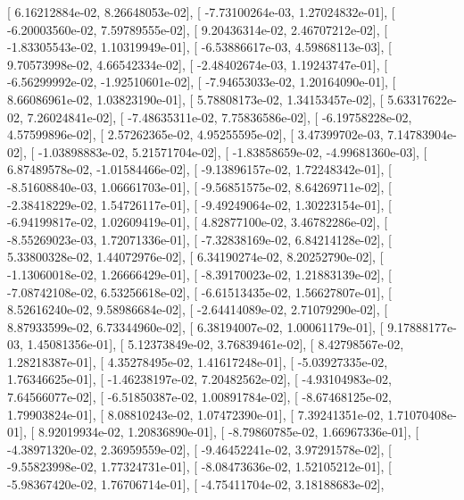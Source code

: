 \documentclass{article}
\begin{document}
       [  6.16212884e-02,   8.26648053e-02],
       [ -7.73100264e-03,   1.27024832e-01],
       [ -6.20003560e-02,   7.59789555e-02],
       [  9.20436314e-02,   2.46707212e-02],
       [ -1.83305543e-02,   1.10319949e-01],
       [ -6.53886617e-03,   4.59868113e-03],
       [  9.70573998e-02,   4.66542334e-02],
       [ -2.48402674e-03,   1.19243747e-01],
       [ -6.56299992e-02,  -1.92510601e-02],
       [ -7.94653033e-02,   1.20164090e-01],
       [  8.66086961e-02,   1.03823190e-01],
       [  5.78808173e-02,   1.34153457e-02],
       [  5.63317622e-02,   7.26024841e-02],
       [ -7.48635311e-02,   7.75836586e-02],
       [ -6.19758228e-02,   4.57599896e-02],
       [  2.57262365e-02,   4.95255595e-02],
       [  3.47399702e-03,   7.14783904e-02],
       [ -1.03898883e-02,   5.21571704e-02],
       [ -1.83858659e-02,  -4.99681360e-03],
       [  6.87489578e-02,  -1.01584466e-02],
       [ -9.13896157e-02,   1.72248342e-01],
       [ -8.51608840e-03,   1.06661703e-01],
       [ -9.56851575e-02,   8.64269711e-02],
       [ -2.38418229e-02,   1.54726117e-01],
       [ -9.49249064e-02,   1.30223154e-01],
       [ -6.94199817e-02,   1.02609419e-01],
       [  4.82877100e-02,   3.46782286e-02],
       [ -8.55269023e-03,   1.72071336e-01],
       [ -7.32838169e-02,   6.84214128e-02],
       [  5.33800328e-02,   1.44072976e-02],
       [  6.34190274e-02,   8.20252790e-02],
       [ -1.13060018e-02,   1.26666429e-01],
       [ -8.39170023e-02,   1.21883139e-02],
       [ -7.08742108e-02,   6.53256618e-02],
       [ -6.61513435e-02,   1.56627807e-01],
       [  8.52616240e-02,   9.58986684e-02],
       [ -2.64414089e-02,   2.71079290e-02],
       [  8.87933599e-02,   6.73344960e-02],
       [  6.38194007e-02,   1.00061179e-01],
       [  9.17888177e-03,   1.45081356e-01],
       [  5.12373849e-02,   3.76839461e-02],
       [  8.42798567e-02,   1.28218387e-01],
       [  4.35278495e-02,   1.41617248e-01],
       [ -5.03927335e-02,   1.76346625e-01],
       [ -1.46238197e-02,   7.20482562e-02],
       [ -4.93104983e-02,   7.64566077e-02],
       [ -6.51850387e-02,   1.00891784e-02],
       [ -8.67468125e-02,   1.79903824e-01],
       [  8.08810243e-02,   1.07472390e-01],
       [  7.39241351e-02,   1.71070408e-01],
       [  8.92019934e-02,   1.20836890e-01],
       [ -8.79860785e-02,   1.66967336e-01],
       [ -4.38971320e-02,   2.36959559e-02],
       [ -9.46452241e-02,   3.97291578e-02],
       [ -9.55823998e-02,   1.77324731e-01],
       [ -8.08473636e-02,   1.52105212e-01],
       [ -5.98367420e-02,   1.76706714e-01],
       [ -4.75411704e-02,   3.18188683e-02],
\end{document}

